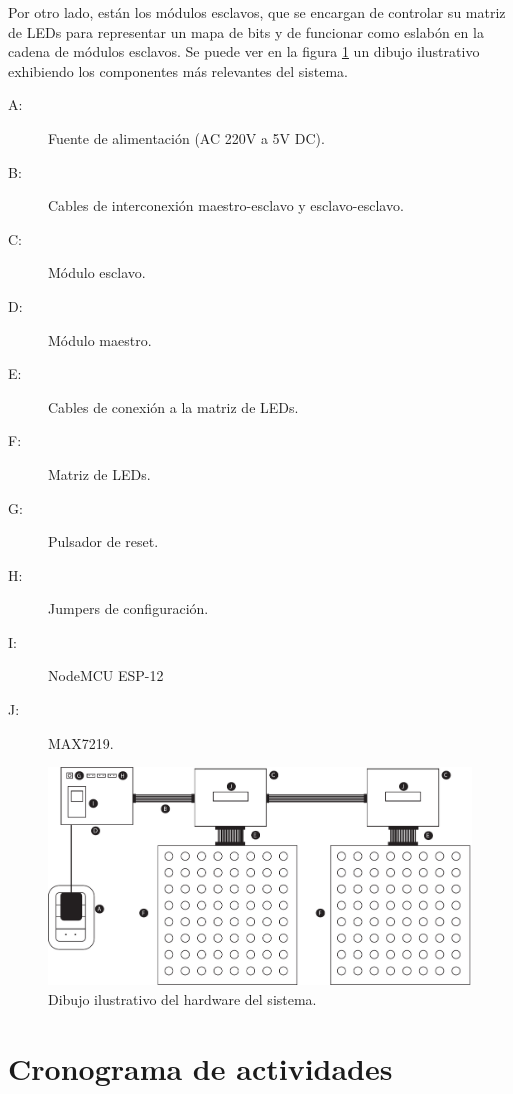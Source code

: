 	Por otro lado, están los módulos esclavos, que se encargan de controlar su matriz de LEDs para representar un mapa de bits y de funcionar como eslabón en la cadena de módulos esclavos. Se puede ver en la figura \ref{fig:dibujo-real} un dibujo ilustrativo exhibiendo los componentes más relevantes del sistema.
	\begin{description}
		\item[A: ] Fuente de alimentación (AC 220V a 5V DC).
		\item[B: ] Cables de interconexión maestro-esclavo y esclavo-esclavo.
		\item[C: ] Módulo esclavo.
		\item[D: ] Módulo maestro.
		\item[E: ] Cables de conexión a la matriz de LEDs.
		\item[F: ] Matriz de LEDs.
		\item[G: ] Pulsador de reset.
		\item[H: ] Jumpers de configuración.
		\item[I: ] NodeMCU ESP-12
		\item[J: ] MAX7219.
	\end{description}
	
	\begin{figure}[ht!]
		\begin{center}
			\centering
			\includegraphics[width=1.1\linewidth]{imagenes/dibujo-fisico.pdf}
			\caption{Dibujo ilustrativo del hardware del sistema.}
			\label{fig:dibujo-real}
		\end{center}
	\end{figure}

	
\section{Cronograma de actividades}

